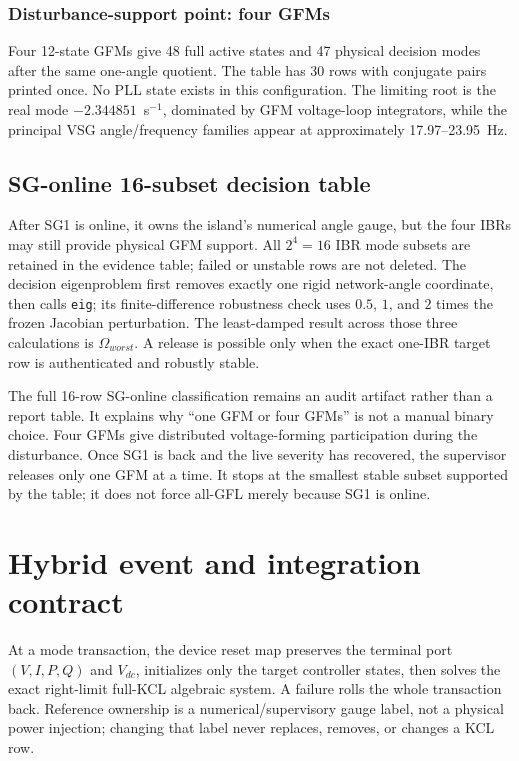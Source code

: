 \documentclass[12pt,a4paper]{article}
\begin{document}
\subsubsection*{Disturbance-support point: four GFMs}

Four 12-state GFMs give 48 full active states and 47 physical decision modes after the same one-angle
quotient. The table has 30 rows with conjugate pairs printed once. No PLL state exists in this
configuration. The limiting root is the real mode $-2.344851$~s$^{-1}$, dominated by GFM voltage-loop
integrators, while the principal VSG angle/frequency families appear at approximately
17.97--23.95~Hz.



\subsection{SG-online 16-subset decision table}

After SG1 is online, it owns the island's numerical angle gauge, but the four IBRs may still
provide physical GFM support. All $2^4=16$ IBR mode subsets are retained in the evidence table;
failed or unstable rows are not deleted. The decision eigenproblem first removes exactly one
rigid network-angle coordinate, then calls \texttt{eig}; its finite-difference robustness check
uses $0.5$, $1$, and $2$ times the frozen Jacobian perturbation. The least-damped result across
those three calculations is $\Omega_{worst}$. A release is possible only when the exact one-IBR
target row is authenticated and robustly stable.

The full 16-row SG-online classification remains an audit artifact rather than a report table.
It explains why ``one GFM or four GFMs'' is not a manual binary choice. Four GFMs give
distributed voltage-forming participation during the disturbance. Once SG1 is back and the live
severity has recovered, the supervisor releases only one GFM at a time. It stops at the smallest
stable subset supported by the table; it does not force all-GFL merely because SG1 is online.

\section{Hybrid event and integration contract}

At a mode transaction, the device reset map preserves the terminal port
$(V,I,P,Q)$ and $V_{dc}$, initializes only the target controller states, then solves the exact
right-limit full-KCL algebraic system. A failure rolls the whole transaction back. Reference
ownership is a numerical/supervisory gauge label, not a physical power injection; changing that
label never replaces, removes, or changes a KCL row.
\end{document}
